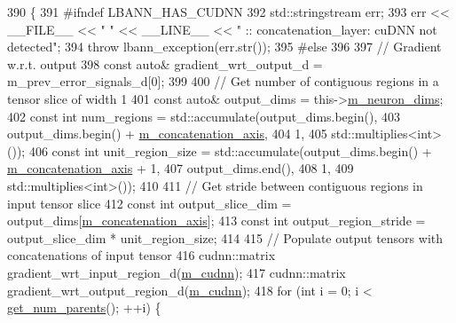 \begin{DoxyCode}
390                         \{
391 \textcolor{preprocessor}{  #ifndef LBANN\_HAS\_CUDNN}
392     std::stringstream err;
393     err << \_\_FILE\_\_ << \textcolor{stringliteral}{" "} << \_\_LINE\_\_ << \textcolor{stringliteral}{" :: concatenation\_layer: cuDNN not detected"};
394     \textcolor{keywordflow}{throw} lbann\_exception(err.str());
395 \textcolor{preprocessor}{  #else}
396 
397     \textcolor{comment}{// Gradient w.r.t. output}
398     \textcolor{keyword}{const} \textcolor{keyword}{auto}& gradient\_wrt\_output\_d = m\_prev\_error\_signals\_d[0];
399 
400     \textcolor{comment}{// Get number of contiguous regions in a tensor slice of width 1}
401     \textcolor{keyword}{const} \textcolor{keyword}{auto}& output\_dims = this->\hyperlink{classlbann_1_1Layer_abb34bb8031f57a483e2e327a5f229f48}{m\_neuron\_dims};
402     \textcolor{keyword}{const} \textcolor{keywordtype}{int} num\_regions = std::accumulate(output\_dims.begin(),
403                                             output\_dims.begin() + 
      \hyperlink{classlbann_1_1concatenation__layer_a4ac4a931dc85d622e9ea8fddb9625d38}{m\_concatenation\_axis},
404                                             1,
405                                             std::multiplies<int>());
406     \textcolor{keyword}{const} \textcolor{keywordtype}{int} unit\_region\_size = std::accumulate(output\_dims.begin() + 
      \hyperlink{classlbann_1_1concatenation__layer_a4ac4a931dc85d622e9ea8fddb9625d38}{m\_concatenation\_axis} + 1,
407                                                  output\_dims.end(),
408                                                  1,
409                                                  std::multiplies<int>());
410 
411     \textcolor{comment}{// Get stride between contiguous regions in input tensor slice}
412     \textcolor{keyword}{const} \textcolor{keywordtype}{int} output\_slice\_dim = output\_dims[\hyperlink{classlbann_1_1concatenation__layer_a4ac4a931dc85d622e9ea8fddb9625d38}{m\_concatenation\_axis}];
413     \textcolor{keyword}{const} \textcolor{keywordtype}{int} output\_region\_stride = output\_slice\_dim * unit\_region\_size;
414     
415     \textcolor{comment}{// Populate output tensors with concatenations of input tensor}
416     cudnn::matrix gradient\_wrt\_input\_region\_d(\hyperlink{classlbann_1_1Layer_a08dbb94239e3b8c96329786c57c72e21}{m\_cudnn});
417     cudnn::matrix gradient\_wrt\_output\_region\_d(\hyperlink{classlbann_1_1Layer_a08dbb94239e3b8c96329786c57c72e21}{m\_cudnn});
418     \textcolor{keywordflow}{for} (\textcolor{keywordtype}{int} i = 0; i < \hyperlink{classlbann_1_1Layer_ac9290d4a6453ccda5f6b4d8b57b49ba3}{get\_num\_parents}(); ++i) \{

\end{DoxyCode}
